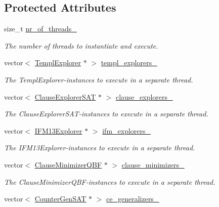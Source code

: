 \subsection*{Protected Attributes}
\begin{DoxyCompactItemize}
\item 
size\-\_\-t \hyperlink{classParallelLearner_a170a0abad017845877039684507e7a66}{nr\-\_\-of\-\_\-threads\-\_\-}
\begin{DoxyCompactList}\small\item\em The number of threads to instantiate and execute. \end{DoxyCompactList}\item 
vector$<$ \hyperlink{classTemplExplorer}{Templ\-Explorer} $\ast$ $>$ \hyperlink{classParallelLearner_af25fc31c964c9157459041eb6eb229cd}{templ\-\_\-explorers\-\_\-}
\begin{DoxyCompactList}\small\item\em The Templ\-Explorer-\/instances to execute in a separate thread. \end{DoxyCompactList}\item 
vector$<$ \hyperlink{classClauseExplorerSAT}{Clause\-Explorer\-S\-A\-T} $\ast$ $>$ \hyperlink{classParallelLearner_a0e8b5dd12c8ae14089d3ce3117da3c16}{clause\-\_\-explorers\-\_\-}
\begin{DoxyCompactList}\small\item\em The Clause\-Explorer\-S\-A\-T-\/instances to execute in a separate thread. \end{DoxyCompactList}\item 
vector$<$ \hyperlink{classIFM13Explorer}{I\-F\-M13\-Explorer} $\ast$ $>$ \hyperlink{classParallelLearner_a614707a21f36d75a9fd06be57ee421d0}{ifm\-\_\-explorers\-\_\-}
\begin{DoxyCompactList}\small\item\em The I\-F\-M13\-Explorer-\/instances to execute in a separate thread. \end{DoxyCompactList}\item 
vector$<$ \hyperlink{classClauseMinimizerQBF}{Clause\-Minimizer\-Q\-B\-F} $\ast$ $>$ \hyperlink{classParallelLearner_adb5aa1e016e04c607073eaf90d994dc7}{clause\-\_\-minimizers\-\_\-}
\begin{DoxyCompactList}\small\item\em The Clause\-Minimizer\-Q\-B\-F-\/instances to execute in a separate thread. \end{DoxyCompactList}\item 
vector$<$ \hyperlink{classCounterGenSAT}{Counter\-Gen\-S\-A\-T} $\ast$ $>$ \hyperlink{classParallelLearner_a46cc16764d7ea8ffafe8d1b696c35df3}{ce\-\_\-generalizers\-\_\-}

\end{DoxyCompactItemize}
